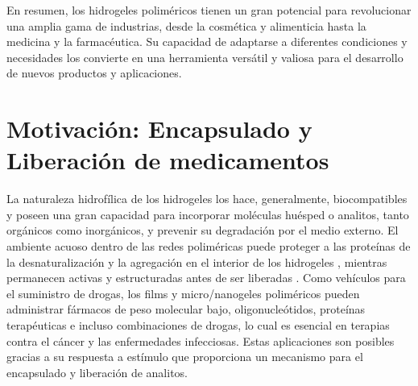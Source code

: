 En resumen, los hidrogeles polim\'ericos tienen un gran potencial para revolucionar una amplia gama de industrias, desde la cosm\'etica y alimenticia hasta la medicina y la farmac\'eutica. Su capacidad de adaptarse a diferentes condiciones y necesidades los convierte en una herramienta vers\'atil y valiosa para el desarrollo de nuevos productos y aplicaciones.




\section{Motivaci\'on: Encapsulado y Liberaci\'on de medicamentos}

La naturaleza hidrof\'ilica de los hidrogeles los hace, generalmente, biocompatibles y poseen una gran capacidad para incorporar mol\'eculas hu\'esped o analitos, tanto org\'anicos como inorg\'anicos, y prevenir su degradaci\'on por el medio externo.
El ambiente acuoso dentro de las redes polim\'ericas puede proteger a las prote\'inas de la desnaturalizaci\'on y la agregaci\'on en el interior de los hidrogeles \cite{asayama2008comparison,sawada2010nano,beierle2014polymer}, mientras permanecen activas y estructuradas antes de ser liberadas \cite{vermonden2012hydrogels}. 
Como veh\'iculos para el suministro de drogas, los films y micro/nanogeles polim\'ericos pueden administrar f\'armacos de peso molecular bajo, oligonucle\'otidos, prote\'inas terap\'euticas e incluso combinaciones de drogas, lo cual es esencial en terapias contra el c\'ancer y las enfermedades infecciosas.
Estas aplicaciones son posibles gracias a su respuesta a est\'imulo que proporciona un mecanismo para el encapsulado y liberaci\'on de analitos.


